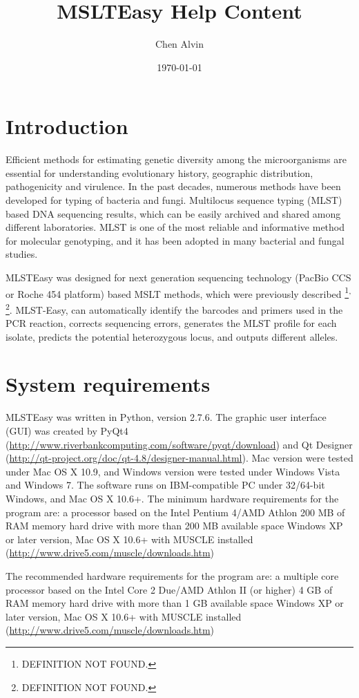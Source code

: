 \documentclass[11pt]{article}
\author{Chen Alvin}
\date{\today}
\title{MSLTEasy Help Content}
\begin{document}
\maketitle
\tableofcontents

\section[Introduction]{Introduction}
\label{sec-1}
Efficient methods for estimating genetic diversity among the microorganisms are essential for understanding evolutionary history, geographic distribution, pathogenicity and virulence. In the past decades, numerous methods have been developed for typing of bacteria and fungi. Multilocus sequence typing (MLST) based DNA sequencing results, which can be easily archived and shared among different laboratories. MLST is one of the most reliable and informative method for molecular genotyping, and it has been adopted in many bacterial and fungal studies. 

MLSTEasy was designed for next generation sequencing technology (PacBio CCS or Roche 454 platform) based MSLT methods, which were previously described \footnote{DEFINITION NOT FOUND.}\textsuperscript{,}\,\footnote{DEFINITION NOT FOUND.}. MLST-Easy, can automatically identify the barcodes and primers used in the PCR reaction, corrects sequencing errors, generates the MLST profile for each isolate, predicts the potential heterozygous locus, and outputs different alleles. 

\section[System requirements]{System requirements}
\label{sec-2}
MLSTEasy was written in Python, version 2.7.6. The graphic user interface (GUI) was created by PyQt4 (\url{http://www.riverbankcomputing.com/software/pyqt/download}) and Qt Designer (\url{http://qt-project.org/doc/qt-4.8/designer-manual.html}). Mac version were tested under Mac OS X 10.9, and Windows version were tested under Windows Vista and Windows 7. The software runs on IBM-compatible PC under 32/64-bit Windows, and Mac OS X 10.6+. The minimum hardware requirements for the program are:
  a processor based on the Intel Pentium 4/AMD Athlon
  200 MB of RAM memory
  hard drive with more than 200 MB available space
  Windows XP or later version, Mac OS X 10.6+ with MUSCLE installed (\url{http://www.drive5.com/muscle/downloads.htm})

The recommended hardware requirements for the program are:
  a multiple core processor based on the Intel Core 2 Due/AMD Athlon II (or higher)
  4 GB of RAM memory
  hard drive with more than 1 GB available space
  Windows XP or later version, Mac OS X 10.6+ with MUSCLE installed (\url{http://www.drive5.com/muscle/downloads.htm})
\end{document}
